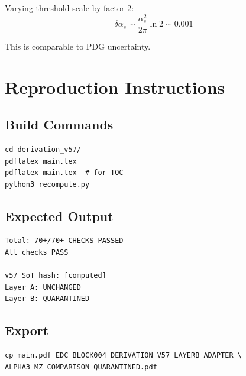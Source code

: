 \documentclass[11pt,a4paper]{article}
\theoremstyle{definition}
\begin{document}
Varying threshold scale by factor 2:
\begin{equation}
\label{eq:thresh-uncert}
\delta\alpha_s \sim \frac{\alpha_s^2}{2\pi}\ln 2 \sim 0.001
\end{equation}

This is comparable to PDG uncertainty.

\section{Reproduction Instructions}
\label{app:reproduction}

\subsection{Build Commands}
\label{subsec:build}

\begin{verbatim}
cd derivation_v57/
pdflatex main.tex
pdflatex main.tex  # for TOC
python3 recompute.py
\end{verbatim}

\subsection{Expected Output}
\label{subsec:expected}

\begin{verbatim}
Total: 70+/70+ CHECKS PASSED
All checks PASS

v57 SoT hash: [computed]
Layer A: UNCHANGED
Layer B: QUARANTINED
\end{verbatim}

\subsection{Export}
\label{subsec:export}

\begin{verbatim}
cp main.pdf EDC_BLOCK004_DERIVATION_V57_LAYERB_ADAPTER_\
ALPHA3_MZ_COMPARISON_QUARANTINED.pdf
\end{verbatim}

\end{document}
